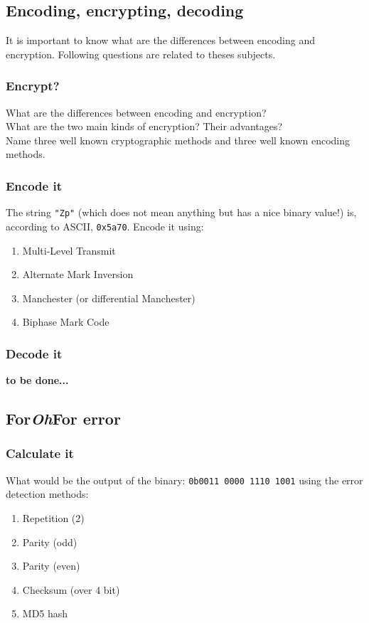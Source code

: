 \documentclass[11pt]{article}
\begin{document}
\subsection{Encoding, encrypting, decoding}
It is important to know what are the differences between encoding and encryption. Following questions are related to theses subjects.
\subsubsection{Encrypt?}
What are the differences between encoding and encryption?\\
What are the two main kinds of encryption? Their advantages?\\
Name three well known cryptographic methods and three well known encoding methods.

\subsubsection{Encode it}
The string \verb$"Zp"$ (which does not mean anything but has a nice binary value!) is, according to ASCII, \verb$0x5a70$. Encode it using:
  \begin{enumerate}
    \item Multi-Level Transmit
    \item Alternate Mark Inversion
    \item Manchester (or differential Manchester)
    \item Biphase Mark Code
  \end{enumerate}

\subsubsection{Decode it}
\textbf{to be done...}

\subsection{For\emph{Oh}For error}
\subsubsection{Calculate it}
What would be the output of the binary: \verb$0b0011 0000 1110 1001$ using the error detection methods:
  \begin{enumerate}
    \item Repetition (2)
    \item Parity (odd)
    \item Parity (even)
    \item Checksum (over 4 bit)
    \item MD5 hash
  \end{enumerate}
\end{document}

